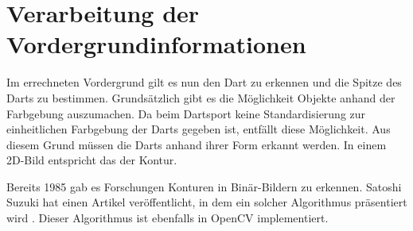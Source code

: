 \section{Verarbeitung der Vordergrundinformationen}
\label{sec:foreground}
Im errechneten Vordergrund gilt es nun den Dart zu erkennen und die Spitze des Darts zu bestimmen. Grundsätzlich gibt es die Möglichkeit Objekte anhand der Farbgebung auszumachen. Da beim Dartsport keine Standardisierung zur einheitlichen Farbgebung der Darts gegeben ist, entfällt diese Möglichkeit. Aus diesem Grund müssen die Darts anhand ihrer Form erkannt werden. In einem 2D-Bild entspricht das der Kontur.

Bereits 1985 gab es Forschungen Konturen in Binär-Bildern zu erkennen. Satoshi Suzuki hat einen Artikel veröffentlicht, in dem ein solcher Algorithmus präsentiert wird \autocite{contour1985}. Dieser Algorithmus ist ebenfalls in OpenCV implementiert. 

